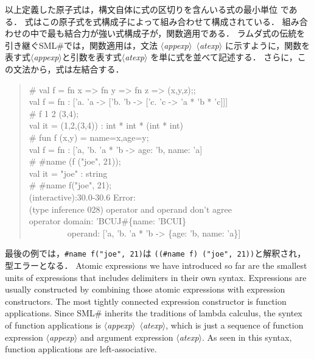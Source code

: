 \documentclass{jbook}
\newcommand{\smlsharp}{SML\#}
\newcommand{\code}[1]{\mbox{\large\tt #1}}
\newcommand{\nonterm}[1]{\mbox{$\langle$}{\it #1}\mbox{$\rangle$}}
\newcommand{\myem}{\mbox{\ \ }}
\newenvironment{program}{\begin{quote}\begin{tt}}%
                        {\end{tt}\end{quote}}
\begin{document}
\ifjp%
	以上定義した原子式は，構文自体に式の区切りを含んいる式の最小単位
である．
	式はこの原子式を式構成子によって組み合わせて構成されている．
	組み合わせの中で最も結合力が強い式構成子が，関数適用である．
	ラムダ式の伝統を引き継ぐ\smlsharp{}では，関数適用は，文法
\nonterm{appexp}\ \nonterm{atexp}
に示すように，関数を表す式\nonterm{appexp}と引数を表す式\nonterm{atexp}
を単に式を並べて記述する．
	さらに，この文法から，式は左結合する．
\begin{program}
\# val f = fn x => fn y => fn z => (x,y,z);;
\\
val f = fn : ['a. 'a -> ['b. 'b -> ['c. 'c -> 'a * 'b * 'c]]]
\\
\# f 1 2 (3,4);
\\
val it = (1,2,(3,4)) : int * int * (int * int)
\\
\# fun f (x,y) = {name=x,age=y};
\\
val f = fn : ['a, 'b. 'a * 'b -> {age: 'b, name: 'a}]
\\
\# \#name (f ("joe", 21));
\\
val it = "joe" : string
\\
\# \#name f("joe", 21);
\\
(interactive):30.0-30.6 Error:
\\
  (type inference 028) operator and operand don't agree
\\
  operator domain: 'BCUJ\#\{name: 'BCUI\}
\\
\myem\myem\myem\myem\          operand: ['a, 'b. 'a * 'b -> \{age: 'b, name: 'a\}]
\end{program}
	最後の例では，\code{\#name f("joe", 21)}は
\code{((\#name f) ("joe", 21))}と解釈され，型エラーとなる．
\else%
	Atomic expressions we have introduced so far are the
smallest units of expressions that includes delimiters in their
own syntax.
	Expressions are usually constructed by combining those
atomic expressions with expression constructors.
	The most tightly connected expression constructor is
function applications.
	Since \smlsharp{} inherits the traditions of lambda calculus,
the syntex of function applications is
\nonterm{appexp}\ \nonterm{atexp},
which is just a sequence of
function expression \nonterm{appexp} and
argument expression \nonterm{atexp}.
	As seen in this syntax, function applications are
left-associative.
\end{document}
